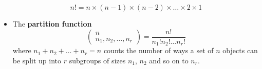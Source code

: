 \begin{itemize}
\begin{equation}
n!=n\times (n-1)\times (n-2)\times \ldots \times 2 \times 1
\end{equation}
\item The \textbf{partition function}
\begin{equation}
\left(\begin{array}{c} n\\n_1,n_2,\ldots,n_r\end{array}\right)=\frac{n!}{n_1!n_2!\ldots n_r!}
\end{equation}
where $n_1+n_2+\ldots+n_r=n$ counts the number of ways a set of $n$
objects can be split up into $r$ subgroups of sizes $n_1$, $n_2$ and
so on to $n_r$.

\end{itemize}

